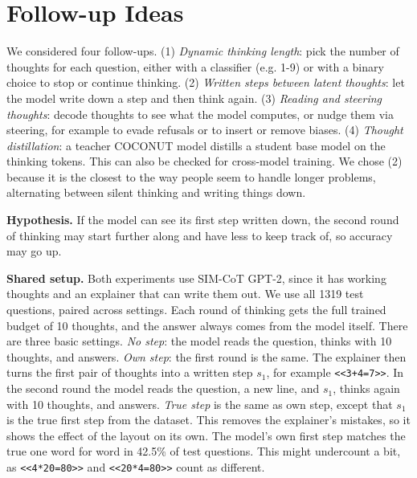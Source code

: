 \documentclass[10pt,letterpaper]{article}
\newcommand{\step}[1]{\texttt{\small #1}}
\begin{document}
\section{Follow-up Ideas}

We considered four follow-ups.\newline
(1) \emph{Dynamic thinking length}: pick the number of thoughts for each question, either with a classifier (e.g. 1-9) or with a binary choice to stop or continue thinking. \newline
(2) \emph{Written steps between latent thoughts}: let the model write down a step and then think again. \newline
(3) \emph{Reading and steering thoughts}: decode thoughts to see what the model computes, or nudge them via steering, for example to evade refusals or to insert or remove biases. \newline
(4) \emph{Thought distillation}: a teacher COCONUT model distills a student base model on the thinking tokens. This can also be checked for cross-model training.
We chose (2) because it is the closest to the way people seem to handle longer problems, alternating between silent
thinking and writing things down.

\textbf{Hypothesis.} If the model can see its first step written down, the second round of thinking may start further along and have less to keep track of, so accuracy may go up.

\textbf{Shared setup.} Both experiments use SIM-CoT GPT-2, since it has working thoughts and an explainer that can
write them out. We use all 1319 test questions, paired across settings. Each round of thinking gets the full trained
budget of 10 thoughts, and the answer always comes from the model itself. There are three basic settings. \newline
\emph{No step}: the model reads the question, thinks with 10 thoughts, and answers. \newline
\emph{Own step}: the first round is the same. The explainer then turns the first pair of thoughts into a written step $s_1$, for example \step{<<3+4=7>>}. \newline
In the second round the model reads the question, a new line, and $s_1$,
thinks again with 10 thoughts, and answers.
\emph{True step} is the same as own step, except that $s_1$ is the true first step from the dataset. This removes the explainer's mistakes, so it shows the effect of the layout on its own.
The model's own first step matches the true one word for word in 42.5\% of test questions. This might undercount a bit, as \step{<<4*20=80>>} and \step{<<20*4=80>>} count as different.
\end{document}
